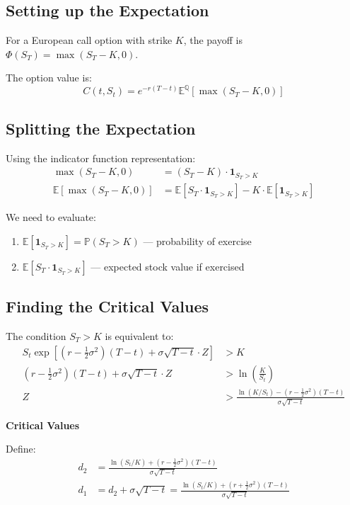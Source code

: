 \documentclass[11pt,a4paper]{article}
\newenvironment{keybox}[1][Key Result]
{\begin{leftbar}\noindent\textbf{\color{theoremblue}#1}\par\vspace{0.5em}}
{\end{leftbar}}
\begin{document}
\subsection{Setting up the Expectation}

For a European call option with strike $K$, the payoff is $\Phi(S_T) = \max(S_T - K, 0)$.

The option value is:
\begin{equation}
C(t,S_t) = e^{-r(T-t)}\mathbb{E}^{\mathbb{Q}}[\max(S_T - K, 0)]
\end{equation}

\subsection{Splitting the Expectation}

Using the indicator function representation:
\begin{align}
\max(S_T - K, 0) &= (S_T - K) \cdot \mathbf{1}_{S_T > K}\\
\mathbb{E}[\max(S_T - K, 0)] &= \mathbb{E}[S_T \cdot \mathbf{1}_{S_T > K}] - K \cdot \mathbb{E}[\mathbf{1}_{S_T > K}]
\end{align}

We need to evaluate:
\begin{enumerate}
    \item $\mathbb{E}[\mathbf{1}_{S_T > K}] = \mathbb{P}(S_T > K)$ — probability of exercise
    \item $\mathbb{E}[S_T \cdot \mathbf{1}_{S_T > K}]$ — expected stock value if exercised
\end{enumerate}

\subsection{Finding the Critical Values}

The condition $S_T > K$ is equivalent to:
\begin{align}
S_t \exp\left[\left(r - \frac{1}{2}\sigma^2\right)(T-t) + \sigma\sqrt{T-t} \cdot Z\right] &> K\\
\left(r - \frac{1}{2}\sigma^2\right)(T-t) + \sigma\sqrt{T-t} \cdot Z &> \ln\left(\frac{K}{S_t}\right)\\
Z &> \frac{\ln(K/S_t) - (r - \frac{1}{2}\sigma^2)(T-t)}{\sigma\sqrt{T-t}}
\end{align}

\begin{keybox}[Critical Values]
Define:
\begin{align}
d_2 &= \frac{\ln(S_t/K) + (r - \frac{1}{2}\sigma^2)(T-t)}{\sigma\sqrt{T-t}}\\
d_1 &= d_2 + \sigma\sqrt{T-t} = \frac{\ln(S_t/K) + (r + \frac{1}{2}\sigma^2)(T-t)}{\sigma\sqrt{T-t}}
\end{align}
\end{keybox}
\end{document}
